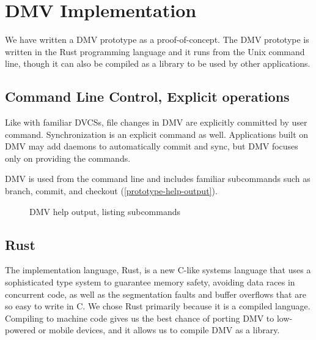 \chapter{DMV Implementation}

We have written a \gls{DMV} prototype as a proof-of-concept. The \gls{DMV}
prototype is written in the Rust programming language and it runs from the Unix
command line, though it can also be compiled as a library to be used by other
applications.


\section{Command Line Control, Explicit operations}

Like with familiar \glspl{DVCS}, file changes in \gls{DMV} are explicitly
committed by user command. Synchronization is an explicit command as well.
Applications built on \gls{DMV} may add daemons to automatically \gls{commit}
and sync, but \gls{DMV} focuses only on providing the commands.

\gls{DMV} is used from the command line and includes familiar subcommands such
as branch, \gls{commit}, and checkout
(\autoref{prototype-help-output}).

\begin{figure}[h]
    \caption{DMV help output, listing subcommands}
    \label{prototype-help-output}

    

\end{figure}



\section{Rust}

The implementation language, Rust, is a new C-like systems language that uses a
sophisticated type system to guarantee memory safety\cite{rust_acm_sigada},
avoiding data races in concurrent code, as well as the segmentation faults and
buffer overflows that are so easy to write in C. We chose Rust primarily because
it is a compiled language. Compiling to machine code gives us the best chance of
porting \gls{DMV} to low-powered or mobile devices, and it allows us to compile DMV as a library.



